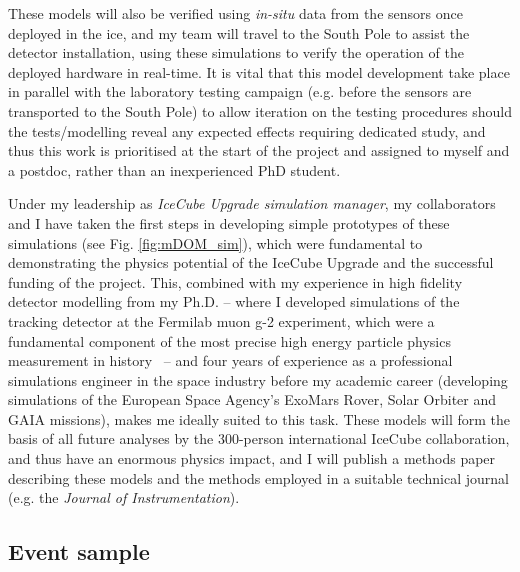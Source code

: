 \documentclass[a4paper,11pt]{article}
\begin{document}
These models will also be verified using \textit{in-situ} data from the sensors once deployed in the ice, and my team will travel to the South Pole to assist the detector installation, using these simulations to verify the operation of the deployed hardware in real-time. It is vital that this model development take place in parallel with the laboratory testing campaign (e.g. before the sensors are transported to the South Pole) to allow iteration on the testing procedures should the tests/modelling reveal any expected effects requiring dedicated study, and thus this work is prioritised at the start of the project and assigned to myself and a postdoc, rather than an inexperienced PhD student.
 
Under my leadership as \textit{IceCube Upgrade simulation manager}, my collaborators and I have taken the first steps in developing simple prototypes of these simulations (see Fig. \ref{fig:mDOM_sim}), which were fundamental to demonstrating the physics potential of the IceCube Upgrade and the successful funding of the project. This, combined with my experience in high fidelity detector modelling from my Ph.D. -- where I developed simulations of the tracking detector at the Fermilab muon g-2 experiment, which were a fundamental component of the most precise high energy particle physics measurement in history~\cite{gm2_run1_result} -- and four years of experience as a professional simulations engineer in the space industry before my academic career (developing simulations of the European Space Agency's ExoMars Rover, Solar Orbiter and GAIA missions), makes me ideally suited to this task. These models will form the basis of all future analyses by the 300-person international IceCube collaboration, and thus have an enormous physics impact,  and I will publish a methods paper describing these models and the methods employed in a suitable technical journal (e.g. the \textit{Journal of Instrumentation}). \\

\subsection{Event sample}
\label{sec:event_sample}
\end{document}
